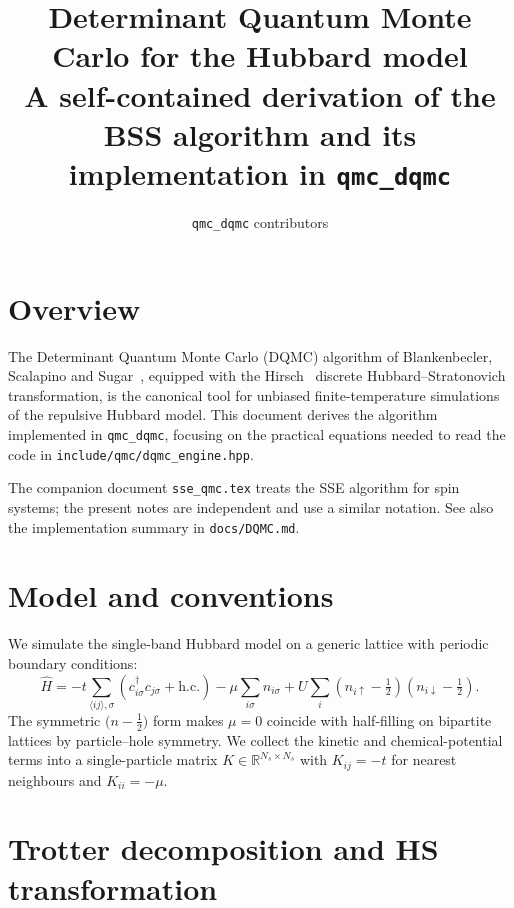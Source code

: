 \documentclass[11pt,a4paper]{article}
\title{\bfseries Determinant Quantum Monte Carlo for the Hubbard model\\
       \large A self-contained derivation of the BSS algorithm and its
              implementation in \texttt{qmc\_dqmc}}
\author{\texttt{qmc\_dqmc} contributors}
\date{}
\newcommand{\Hop}{\hat H}
\newcommand{\Ns}{N_{s}}
\theoremstyle{plain}
\begin{document}
\maketitle
\tableofcontents
\bigskip

\section{Overview}

The Determinant Quantum Monte Carlo (DQMC) algorithm of
Blankenbecler, Scalapino and Sugar~\cite{BSS1981}, equipped with the
Hirsch~\cite{Hirsch1983} discrete Hubbard--Stratonovich transformation,
is the canonical tool for unbiased finite-temperature simulations of
the repulsive Hubbard model. This document derives the algorithm
implemented in \texttt{qmc\_dqmc}, focusing on the practical equations
needed to read the code in \texttt{include/qmc/dqmc\_engine.hpp}.

The companion document \texttt{sse\_qmc.tex} treats the SSE algorithm
for spin systems; the present notes are independent and use a similar
notation. See also the implementation summary in \texttt{docs/DQMC.md}.

\section{Model and conventions}

We simulate the single-band Hubbard model on a generic lattice with
periodic boundary conditions:
\begin{equation}
\Hop = -t \sum_{\langle ij\rangle, \sigma}
            \left( c^{\dagger}_{i\sigma} c_{j\sigma} + \text{h.c.} \right)
       - \mu \sum_{i\sigma} n_{i\sigma}
       + U \sum_{i} \left(n_{i\uparrow} - \tfrac{1}{2}\right)
                    \left(n_{i\downarrow} - \tfrac{1}{2}\right) .
\label{eq:hubbard}
\end{equation}
The symmetric \(\bigl(n - \tfrac{1}{2}\bigr)\) form makes
\(\mu = 0\) coincide with half-filling on bipartite lattices by
particle--hole symmetry. We collect the kinetic and chemical-potential
terms into a single-particle matrix
\(K\in\mathbb{R}^{\Ns\times\Ns}\) with
\(K_{ij} = -t\) for nearest neighbours and \(K_{ii} = -\mu\).

\section{Trotter decomposition and HS transformation}
\end{document}

